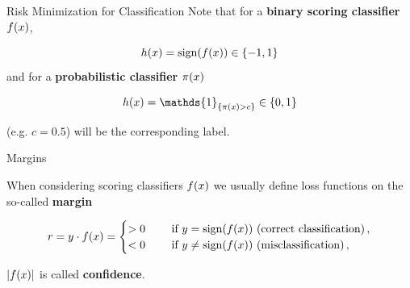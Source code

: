 \begin{vbframe}{Risk Minimization for Classification}
Note that for a \textbf{binary scoring classifier} $f(x)$,

$$
h(x) = \operatorname{sign}(f(x)) \in \{-1, 1\}
$$
and for a \textbf{probabilistic classifier} $\pi(x)$

$$
\hx = \mathds{1}_{\{ \pix > c \}} \in \{0, 1\}
$$

(e.g. $c = 0.5$) will be the corresponding label. 


\end{vbframe}

\begin{vbframe}{Margins} 

When considering scoring classifiers $f(x)$ we usually define loss functions on the so-called \textbf{margin}

$$
r = y\cdot f(x) =  \begin{cases} > 0  \quad &\text{ if } y = \operatorname{sign}(f(x)) \text{ (correct classification)}\,, \\
                      < 0 \quad &\text{ if } y \ne \operatorname{sign}(f(x)) \text{ (misclassification)}\,, \end{cases}
$$

$|f(x)|$ is called \textbf{confidence}.








\end{vbframe}








